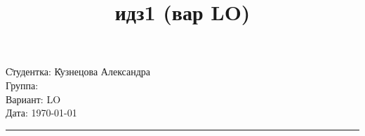 \documentclass{article}
\title{идз1 (вар LO)}
\begin{document}
\begin{tabbing}
	\hspace{11cm} \= Студентка: \= Кузнецова Александра \\
																									
	\> Группа:  \\  
	\> Вариант: \> LO \\   
	\> Дата: \> \today     
\end{tabbing}
\hrule
\vspace{1cm}
\end{document}
